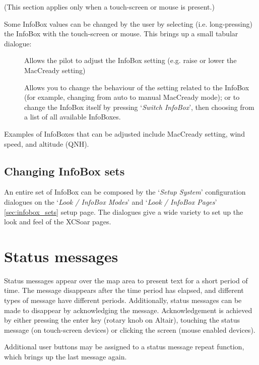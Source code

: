 (This section applies only when a touch-screen or mouse is present.)

Some InfoBox values can be changed by the user by selecting (i.e. long-pressing) the
InfoBox with the touch-screen or mouse.  This brings up a small tabular dialogue:

\begin{description}
\item[]  
  Allows the pilot to adjust the InfoBox setting (e.g. raise or lower the 
  MacCready setting)

\item[]
  Allows you to change the behaviour of the setting related to the InfoBox 
  (for example, changing from auto to manual MacCready mode); or 
  to change the InfoBox itself by pressing `{\it Switch InfoBox}', then 
  choosing from a list of all available InfoBoxes.

\end{description}

Examples of InfoBoxes that can
be adjusted include MacCready setting, wind speed, and altitude (QNH).


\subsection*{Changing InfoBox sets}

An entire set of InfoBox can be composed by the `{\it Setup System}' configuration 
dialogues on the `{\it Look / InfoBox Modes}' and `{\it Look / InfoBox Pages}' 
\ref{sec:infobox_sets} setup page. 
The dialogues give a wide variety to set up the look and feel of the XCSoar pages.  


\section{Status messages}

Status messages appear over the map area to present text for a short period of
time.  The message disappears after the time period has elapsed, and different
types of message have different periods. Additionally, status messages can be
made to disappear by acknowledging the message.  Acknowledgement is achieved by
either pressing the enter key (rotary knob on Altair), touching the status
message (on touch-screen devices) or clicking the screen (mouse enabled devices).

Additional user buttons may be assigned to a status message repeat function,
which brings up the last message again.

